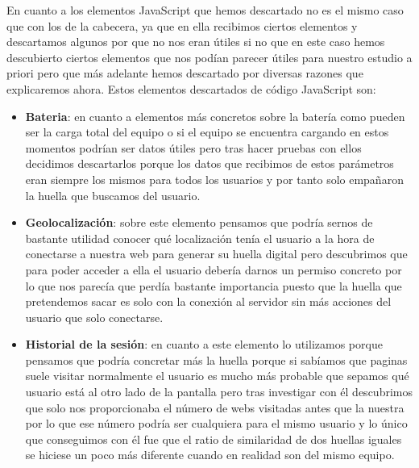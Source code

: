 En cuanto a los elementos JavaScript que hemos descartado no es el mismo caso que con los de la cabecera, ya que en ella recibimos ciertos elementos y descartamos algunos por que no nos eran útiles si no que en este caso hemos descubierto ciertos elementos que nos podían parecer útiles para nuestro estudio a priori pero que más adelante hemos descartado por diversas razones que explicaremos ahora. Estos elementos descartados de código JavaScript son:
\begin{itemize}
    \item \textbf{Bateria}: en cuanto a elementos más concretos sobre la batería como pueden ser la carga total del equipo o si el equipo se encuentra cargando en estos momentos podrían ser datos útiles pero tras hacer pruebas con ellos decidimos descartarlos porque los datos que recibimos de estos parámetros eran siempre los mismos para todos los usuarios y por tanto solo empañaron la huella que buscamos del usuario.
    \item \textbf{Geolocalización}: sobre este elemento pensamos que podría sernos de bastante utilidad conocer qué localización tenía el usuario a la hora de conectarse a nuestra web para generar su huella digital pero descubrimos que para poder acceder a ella el usuario debería darnos un permiso concreto por lo que nos parecía que perdía bastante importancia puesto que la huella que pretendemos sacar es solo con la conexión al servidor sin más acciones del usuario que solo conectarse.
    \item \textbf{Historial de la sesión}: en cuanto a este elemento lo utilizamos porque pensamos que podría concretar más la huella porque si sabíamos que paginas suele visitar normalmente el usuario es mucho más probable que sepamos qué usuario está al otro lado de la pantalla pero tras investigar con él descubrimos que solo nos proporcionaba el número de webs visitadas antes que la nuestra por lo que ese número podría ser cualquiera para el mismo usuario y lo único que conseguimos con él fue que el ratio de similaridad de dos huellas iguales se hiciese un poco más diferente cuando en realidad son del mismo equipo.
\end{itemize}
